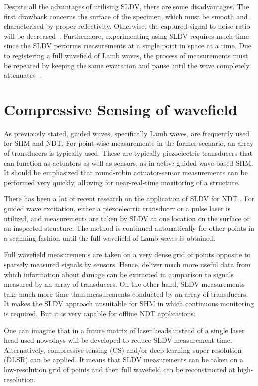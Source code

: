 Despite all the advantages of utilising SLDV, there are some disadvantages. 
The first drawback concerns the surface of the specimen, which must be smooth and characterised by proper reflectivity. Otherwise, the captured signal to noise ratio will be decreased~\cite{Ostachowicz2014}. 
Furthermore, experimenting using  SLDV requires much time since the SLDV performs measurements at a single point in space at a time.
Due to registering a full wavefield of Lamb waves, the process of measurements must be repeated by keeping the same excitation and pause until the wave completely attenuates~\cite{Ostachowicz2014}.
\section{Compressive Sensing of wavefield}
\label{CS}
As previously stated, guided waves, specifically Lamb waves, are frequently used for SHM and NDT.
For point-wise measurements in the former scenario, an array of transducers is typically used.
These are typically piezoelectric transducers that can function as actuators as well as sensors, as in active guided wave-based SHM.
It should be emphasized that round-robin actuator-sensor measurements can be performed very quickly, allowing for near-real-time monitoring of a structure.

There has been a lot of recent research on the application of SLDV for NDT \cite{Flynn2013,Kudela2015,Kudela2018d,Segers2021,Segers2022}.
For guided wave excitation, either a piezoelectric transducer or a pulse laser is utilized, and measurements are taken by SLDV at one location on the surface of an inspected structure.
The method is continued automatically for other points in a scanning fashion until the full wavefield of Lamb waves is obtained.

Full wavefield measurements are taken on a very dense grid of points opposite to sparsely measured signals by sensors.
Hence, deliver much more useful data from which information about damage can be extracted in comparison to signals measured by an array of transducers.
On the other hand, SLDV measurements take much more time than measurements conducted by an array of transducers.
It makes the SLDV approach unsuitable for SHM in which continuous monitoring is required.
But it is very capable for offline NDT applications.

One can imagine that in a future matrix of laser heads instead of a single laser head used nowadays will be developed to reduce SLDV measurement time.
Alternatively, compressive sensing (CS) and/or deep learning super-resolution (DLSR) can be applied.
It means that SLDV measurements can be taken on a low-resolution grid of points and then full wavefield can be reconstructed at high-resolution.


